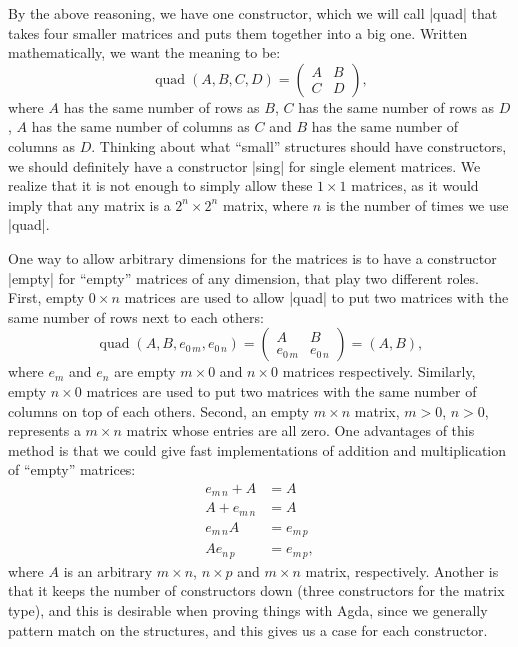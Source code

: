 By the above reasoning, we have one constructor, which we will call |quad| that takes four smaller matrices and puts them together into a big one. Written mathematically, we want the meaning to be:
\begin{equation*}
\operatorname{quad}(A,B,C,D) = 
\begin{pmatrix} 
  A & B \\
  C & D
\end{pmatrix},
\end{equation*}
where $A$ has the same number of rows as $B$, $C$ has the same number of rows as $D$, $A$ has the same number of columns as $C$ and $B$ has the same number of columns as $D$.
Thinking about what ``small'' structures should have constructors, we should definitely have a constructor |sing| for single element matrices. We realize that it is not enough to simply allow these $1 \times 1$ matrices, as it would imply that any matrix is a $2^n \times 2^n$ matrix, where $n$ is the number of times we use |quad|. 

\label{Section:Empty-Matrices}
One way to allow arbitrary dimensions for the matrices is to have a constructor |empty| for ``empty'' matrices of any dimension, that play two different roles. First, empty $0 \times n$ matrices are used to allow |quad| to put two matrices with the same number of rows next to each others:
\begin{equation}
\operatorname{quad}(A, B, e_{0\,m}, e_{0\,n}) =
\begin{pmatrix}
  A & B \\
  e_{0\,m} & e_{0\,n}
\end{pmatrix} = (A,  B),
\end{equation}
where $e_m$ and $e_n$ are empty $m \times 0$ and $n\times 0$ matrices respectively. Similarly, empty $n \times 0$ matrices are used to put two matrices with the same number of columns on top of each others. Second, an empty $m \times n$ matrix, $m > 0$, $n > 0$, represents a $m \times n$ matrix whose entries are all zero. One advantages of this method is that we could give fast implementations of  addition and multiplication of ``empty'' matrices:
\begin{align*}
  e_{m\, n} + A &= A \\ 
  A + e_{m\,n}  &= A \\
  e_{m\, n}   A &= e_{m\,p} \\
  A e_{n\,p}    &= e_{m\,p},
\end{align*}
where $A$ is an arbitrary $m \times n$, $n \times p$ and $m \times n$ matrix, respectively.
Another is that it keeps the number of constructors down (three constructors for the matrix type), and this is desirable when proving things with Agda, since we generally pattern match on the structures, and this gives us a case for each constructor.

